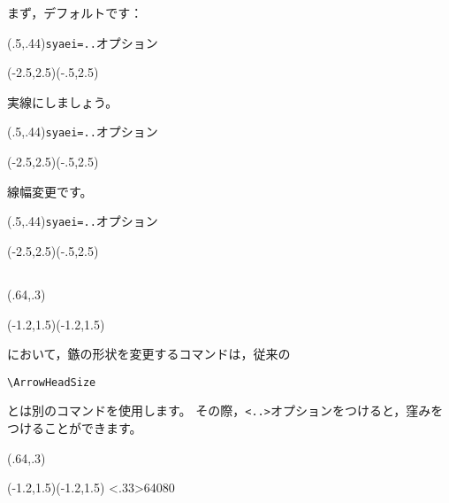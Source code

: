 \documentclass[a4j]{jarticle}
\begin{document}
まず，デフォルトです：

\begin{showEx}(.5,.44){\texttt{syaei=..}オプション}
\begin{pszahyou}[ul=8mm]%
    (-2.5,2.5)(-.5,2.5)
  \Put\A[syaei=xy]{}
\end{pszahyou}
\end{showEx}

実線にしましょう。

\begin{showEx}(.5,.44){\texttt{syaei=..}オプション}
\begin{pszahyou}[ul=8mm]%
    (-2.5,2.5)(-.5,2.5)
  \Put\A[syaei=xy,dash={}]{}
\end{pszahyou}
\end{showEx}

線幅変更です。

\begin{showEx}(.5,.44){\texttt{syaei=..}オプション}
\begin{pszahyou}[ul=8mm]%
    (-2.5,2.5)(-.5,2.5)
  \Put\A[syaei=xy,linewidth=3]{}
\end{pszahyou}
\end{showEx}

\subsection{\texorpdfstring{}{ArrowLine}}
\begin{showEx}(.64,.3){}
\begin{pszahyou}[ul=10mm](-1.2,1.5)(-1.2,1.5)
  \ArrowLine\B\D
\end{pszahyou}
\end{showEx}

において，鏃の形状を変更するコマンドは，従来の
\begin{jquote}
\begin{verbatim}
\ArrowHeadSize
\end{verbatim}
\end{jquote}
とは別のコマンドを使用します。
その際，\verb+<..>+オプションをつけると，窪みをつけることができます。

\begin{showEx}(.64,.3){}
\begin{pszahyou}[ul=10mm](-1.2,1.5)(-1.2,1.5)
  \setarrowsize<.33>{6}{40}{80}
  \ArrowLine\B\D
\end{pszahyou}
\end{showEx}
\end{document}
